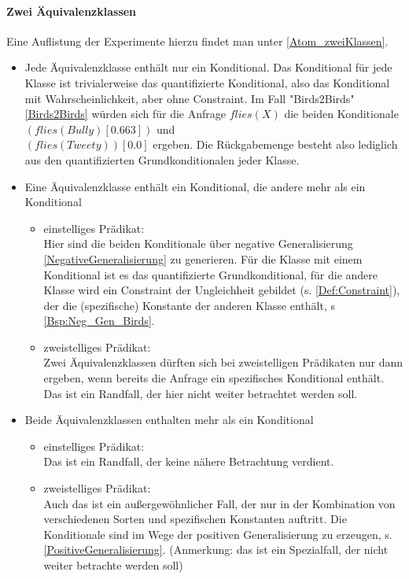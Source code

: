 \documentclass[draft]{scrreprt}
\begin{document}
\paragraph{ Zwei Äquivalenzklassen}
Eine Auflistung der  Experimente hierzu findet man unter \ref{Atom_zweiKlassen}.
\begin{itemize}
\item Jede Äquivalenzklasse enthält nur ein Konditional. Das Konditional für jede Klasse ist trivialerweise das quantifizierte Konditional, also das Konditional mit Wahrscheinlichkeit, aber ohne Constraint. Im Fall "{}Birds2Birds"{} \ref{Birds2Birds} würden sich für die Anfrage $flies(X)$ die beiden Konditionale $ (flies(Bully)[0.663]) $ und \\ $ (flies(Tweety))[0.0] $ ergeben. Die Rückgabemenge besteht also lediglich aus den quantifizierten  Grundkonditionalen jeder Klasse.
\item Eine Äquivalenzklasse enthält ein Konditional, die andere mehr als ein Konditional
\begin{itemize}
	\item einstelliges Prädikat:\\
	Hier sind die beiden Konditionale über negative Generalisierung \ref{NegativeGeneralisierung} zu generieren. Für die Klasse mit einem Konditional ist es das quantifizierte Grundkonditional, für die andere Klasse wird ein Constraint der Ungleichheit gebildet (s. \ref{Def:Constraint}), der die (spezifische) Konstante der anderen Klasse enthält, s \ref{Bsp:Neg_Gen_Birds}. 
	\item zweistelliges Prädikat:\\
	Zwei Äquivalenzklassen dürften sich bei zweistelligen Prädikaten nur dann ergeben, wenn bereits die Anfrage ein spezifisches Konditional enthält. Das ist ein Randfall, der hier nicht weiter betrachtet werden soll. 
\end{itemize}
\item Beide Äquivalenzklassen enthalten mehr als ein Konditional
\begin{itemize}
	\item {einstelliges Prädikat:}\\
	Das ist ein Randfall, der keine nähere Betrachtung verdient.
	\item zweistelliges Prädikat:\\
	Auch das ist ein außergewöhnlicher Fall, der nur in der Kombination von verschiedenen Sorten und spezifischen Konstanten auftritt. Die Konditionale sind im Wege der positiven Generalisierung zu erzeugen, s. \ref{PositiveGeneralisierung}.
	(Anmerkung: das ist ein Spezialfall, der nicht weiter betrachte werden soll)
\end{itemize}
\end{itemize}
\end{document}
